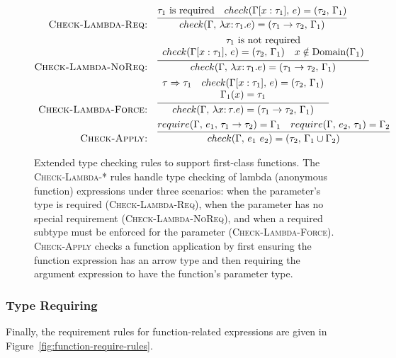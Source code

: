 \documentclass[10pt,conference]{IEEEtran}
\newcommand{\funct}[3]{\ensuremath{\lambda #1\mathsf{:}\,#2.#3}}
\newcommand{\apply}[2]{\ensuremath{#1\ #2}}
\newcommand{\arrowt}[2]{\ensuremath{{#1}\rightarrow{#2}}}
\newcommand{\checktype}[4]{\ensuremath{{check}(#1,\,#2)=(#3,\,#4)}}
\newcommand{\requiretype}[4]{\ensuremath{{require}(#1,\,#2,\,#3)=#4}}
\newcommand{\required}[1]{\ensuremath{#1\text{ is required}}}
\newcommand{\nrequired}[1]{\ensuremath{#1\text{ is not required}}}
\newcommand{\forcerequire}[2]{\ensuremath{#1\Rightarrow#2}}
\begin{document}
\begin{figure*}[ht]
\centering
\begin{framed}
\begin{align*}
\text{\textsc{Check-Lambda-Req:}} &\quad \infer{\checktype{\Gamma}{\funct{x}{\tau_1}{e}}{\arrowt{\tau_1}{\tau_2}}{\Gamma_1}}{\required{\tau_1} \quad \checktype{\Gamma[x:\tau_1]}{e}{\tau_2}{\Gamma_1}} \\
\text{\textsc{Check-Lambda-NoReq:}} &\quad \infer{\checktype{\Gamma}{\funct{x}{\tau_1}{e}}{\arrowt{\tau_1}{\tau_2}}{\Gamma_1}}{
\begin{array}{c}
\nrequired{\tau_1} \\
\checktype{\Gamma[x:\tau_1]}{e}{\tau_2}{\Gamma_1} \quad x \notin \text{Domain}(\Gamma_1)
\end{array}
} \\
\text{\textsc{Check-Lambda-Force:}} &\quad \infer{\checktype{\Gamma}{\funct{x}{\tau}{e}}{\arrowt{\tau_1}{\tau_2}}{\Gamma_1}}{
\begin{array}{c}
\forcerequire{\tau}{\tau_1} \quad \checktype{\Gamma[x:\tau_1]}{e}{\tau_2}{\Gamma_1} \\
\Gamma_1(x) = \tau_1
\end{array}
} \\
\text{\textsc{Check-Apply:}} &\quad \infer{\checktype{\Gamma}{\apply{e_1}{e_2}}{\tau_2}{\Gamma_1 \cup \Gamma_2}}{\requiretype{\Gamma}{e_1}{\arrowt{\tau_1}{\tau_2}}{\Gamma_1} \quad \requiretype{\Gamma}{e_2}{\tau_1}{\Gamma_2}}
\end{align*}
\end{framed}
\caption{Extended type checking rules to support first-class functions. The \textsc{Check-Lambda-*} rules handle type checking of lambda (anonymous function) expressions under three scenarios: when the parameter's type is required (\textsc{Check-Lambda-Req}), when the parameter has no special requirement (\textsc{Check-Lambda-NoReq}), and when a required subtype must be enforced for the parameter (\textsc{Check-Lambda-Force}). \textsc{Check-Apply} checks a function application by first ensuring the function expression has an arrow type and then requiring the argument expression to have the function's parameter type.}
\label{fig:function-check-rules}
\end{figure*}

\subsubsection{Type Requiring}
Finally, the requirement rules for function-related expressions are given in Figure~\ref{fig:function-require-rules}.
\end{document}
